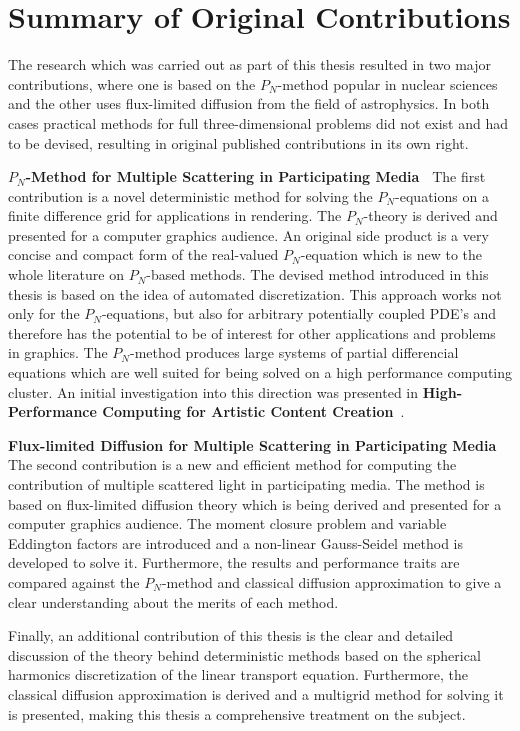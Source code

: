 \section{Summary of Original Contributions}

The research which was carried out as part of this thesis resulted in two major contributions, where one is based on the $P_N$-method popular in nuclear sciences and the other uses flux-limited diffusion from the field of astrophysics. In both cases practical methods for full three-dimensional problems did not exist and had to be devised, resulting in original published contributions in its own right.

\textbf{$P_N$-Method for Multiple Scattering in Participating Media~\cite{Koerner18}} The first contribution is a novel deterministic method for solving the $P_N$-equations on a finite difference grid for applications in rendering. The $P_N$-theory is derived and presented for a computer graphics audience. An original side product is a very concise and compact form of the real-valued $P_N$-equation which is new to the whole literature on $P_N$-based methods. The devised method introduced in this thesis is based on the idea of automated discretization. This approach works not only for the $P_N$-equations, but also for arbitrary potentially coupled PDE's and therefore has the potential to be of interest for other applications and problems in graphics. The $P_N$-method produces large systems of partial differencial equations which are well suited for being solved on a high performance computing cluster. An initial investigation into this direction was presented in \textbf{High-Performance Computing for Artistic Content Creation}~\cite{Koerner17}.

\textbf{Flux-limited Diffusion for Multiple Scattering in Participating Media~\cite{Koerner14}} The second contribution is a new and efficient method for computing the contribution of multiple scattered light in participating media. The method is based on flux-limited diffusion theory which is being derived and presented for a computer graphics audience. The moment closure problem and variable Eddington factors are introduced and a non-linear Gauss-Seidel method is developed to solve it. Furthermore, the results and performance traits are compared against the $P_N$-method and classical diffusion approximation to give a clear understanding about the merits of each method.

Finally, an additional contribution of this thesis is the clear and detailed discussion of the theory behind deterministic methods based on the spherical harmonics discretization of the linear transport equation. Furthermore, the classical diffusion approximation is derived and a multigrid method for solving it is presented, making this thesis a comprehensive treatment on the subject.

